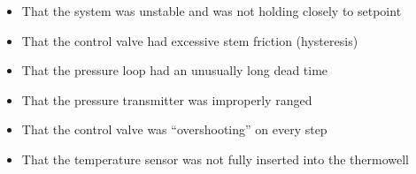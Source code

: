 \begin{itemize}
\item{} That the system was unstable and was not holding closely to setpoint
\vskip 5pt 
\item{} That the control valve had excessive stem friction (hysteresis)
\vskip 5pt 
\item{} That the pressure loop had an unusually long dead time
\vskip 5pt 
\item{} That the pressure transmitter was improperly ranged
\vskip 5pt 
\item{} That the control valve was ``overshooting'' on every step
\vskip 5pt 
\item{} That the temperature sensor was not fully inserted into the thermowell
\end{itemize}




